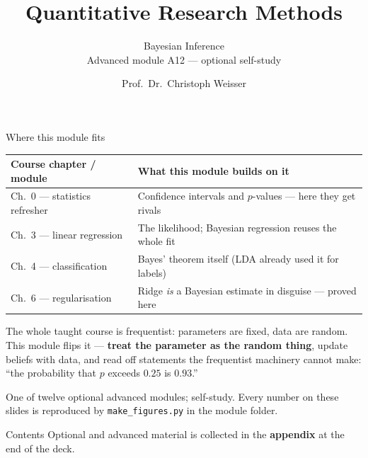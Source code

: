 \documentclass[aspectratio=169,11pt]{beamer}
\title{Quantitative Research Methods}
\subtitle{Bayesian Inference\\[2pt]{\small Advanced module A12 --- optional self-study}}
\author{Prof.\ Dr.\ Christoph Weisser}
\date{}\graphicspath{{images/}}
\begin{document}
\begin{frame}[plain]\titlepage\end{frame}

\begin{frame}{Where this module fits}
  \footnotesize
  \begin{center}
  \begin{tabular}{@{}p{3.9cm}p{8.4cm}@{}}
    \toprule
    \textbf{Course chapter / module} & \textbf{What this module builds on it} \\
    \midrule
    Ch.\ 0 --- statistics refresher & Confidence intervals and $p$-values --- here they get rivals \\
    Ch.\ 3 --- linear regression & The likelihood; Bayesian regression reuses the whole fit \\
    Ch.\ 4 --- classification & Bayes' theorem itself (LDA already used it for labels) \\
    Ch.\ 6 --- regularisation & Ridge \emph{is} a Bayesian estimate in disguise --- proved here \\
    \bottomrule
  \end{tabular}
  \end{center}
  \vspace{2pt}
  \begin{takeaway}
    The whole taught course is frequentist: parameters are fixed, data are random.
    This module flips it --- \textbf{treat the parameter as the random thing},
    update beliefs with data, and read off statements the frequentist machinery
    cannot make: ``the probability that $p$ exceeds $0.25$ is $0.93$.''
  \end{takeaway}
  {\scriptsize One of twelve optional advanced modules; self-study. Every number on
  these slides is reproduced by \texttt{make\_figures.py} in the module folder.}
\end{frame}

\begin{frame}{Contents}\small\tableofcontents[hideallsubsections]
  \vfill
  {\tiny Optional and advanced material is collected in the \textbf{appendix} at the end of the deck.}
\end{frame}
\end{document}
